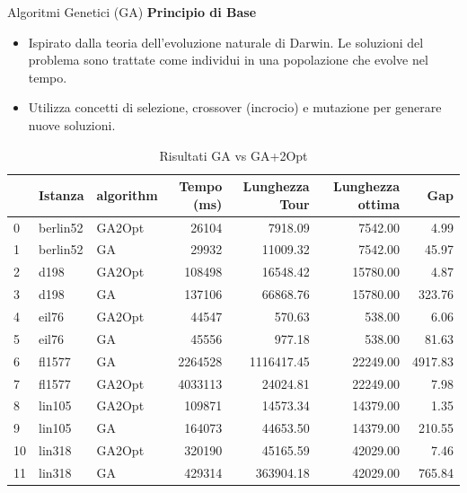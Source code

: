 \documentclass{beamer}
\begin{document}
\begin{frame}{Algoritmi Genetici (GA)}
    \textbf{Principio di Base}
    \begin{itemize}
        \item Ispirato dalla teoria dell'evoluzione naturale di Darwin. Le soluzioni del problema sono trattate come individui in una popolazione che evolve nel tempo.
        \item Utilizza concetti di selezione, crossover (incrocio) e mutazione per generare nuove soluzioni.
    \end{itemize}
    \begin{table}[H]
        \centering

        \caption{Risultati GA vs GA+2Opt}
        \begin{tabular}{lllrrrr}
            \toprule
               & Istanza  & algorithm & Tempo (ms) & Lunghezza Tour & Lunghezza ottima & Gap     \\
            \midrule
            0  & berlin52 & GA2Opt    & 26104      & 7918.09        & 7542.00          & 4.99    \\
            1  & berlin52 & GA        & 29932      & 11009.32       & 7542.00          & 45.97   \\
            2  & d198     & GA2Opt    & 108498     & 16548.42       & 15780.00         & 4.87    \\
            3  & d198     & GA        & 137106     & 66868.76       & 15780.00         & 323.76  \\
            4  & eil76    & GA2Opt    & 44547      & 570.63         & 538.00           & 6.06    \\
            5  & eil76    & GA        & 45556      & 977.18         & 538.00           & 81.63   \\
            6  & fl1577   & GA        & 2264528    & 1116417.45     & 22249.00         & 4917.83 \\
            7  & fl1577   & GA2Opt    & 4033113    & 24024.81       & 22249.00         & 7.98    \\
            8  & lin105   & GA2Opt    & 109871     & 14573.34       & 14379.00         & 1.35    \\
            9  & lin105   & GA        & 164073     & 44653.50       & 14379.00         & 210.55  \\
            10 & lin318   & GA2Opt    & 320190     & 45165.59       & 42029.00         & 7.46    \\
            11 & lin318   & GA        & 429314     & 363904.18      & 42029.00         & 765.84  \\

\end{tabular}
\end{table}
\end{frame}
\end{document}
